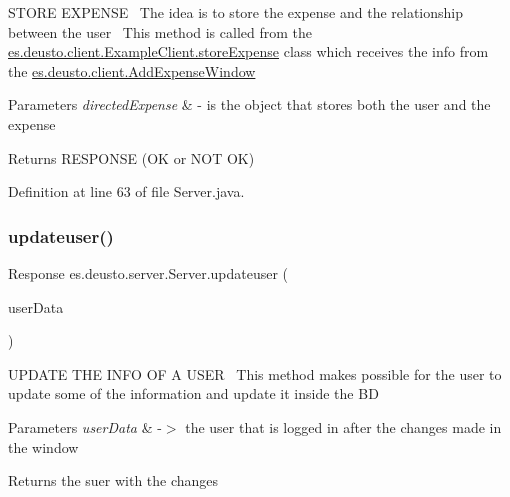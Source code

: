 S\+T\+O\+RE E\+X\+P\+E\+N\+SE~\newline
The idea is to store the expense and the relationship between the user~\newline
 This method is called from the \hyperlink{classes_1_1deusto_1_1client_1_1_example_client_aba5fe3dfb882ef22d0bd49b5915871d3}{es.\+deusto.\+client.\+Example\+Client.\+store\+Expense} class which receives the info from the \hyperlink{classes_1_1deusto_1_1client_1_1_add_expense_window}{es.\+deusto.\+client.\+Add\+Expense\+Window}~\newline

\begin{DoxyParams}{Parameters}
{\em directed\+Expense} & -\/ is the object that stores both the user and the expense \\
\hline
\end{DoxyParams}
\begin{DoxyReturn}{Returns}
R\+E\+S\+P\+O\+N\+SE (OK or N\+OT OK) 
\end{DoxyReturn}


Definition at line 63 of file Server.\+java.

\mbox{\label{classes_1_1deusto_1_1server_1_1_server_aae24e983f2b93173ee25d366a522a936}} 
\subsubsection{\texorpdfstring{updateuser()}{updateuser()}}
{\footnotesize\ttfamily Response es.\+deusto.\+server.\+Server.\+updateuser (\begin{DoxyParamCaption}\item[{\hyperlink{classes_1_1deusto_1_1serialization_1_1_user_data}{User\+Data}}]{user\+Data }\end{DoxyParamCaption})}

U\+P\+D\+A\+TE T\+HE I\+N\+FO OF A U\+S\+ER~\newline
This method makes possible for the user to update some of the information and update it inside the BD


\begin{DoxyParams}{Parameters}
{\em user\+Data} & -\/$>$ the user that is logged in after the changes made in the window \\
\hline
\end{DoxyParams}
\begin{DoxyReturn}{Returns}
the suer with the changes 
\end{DoxyReturn}


